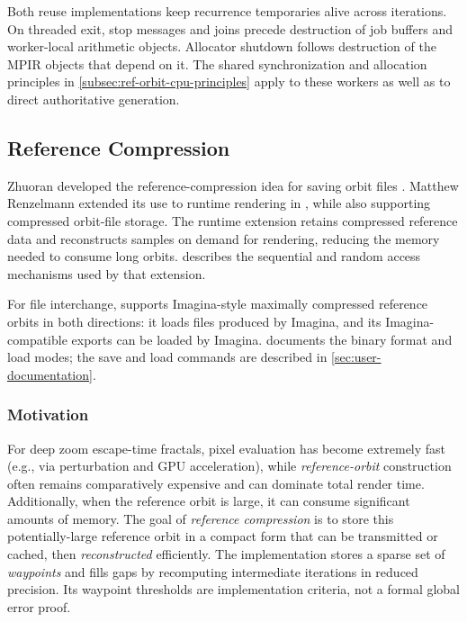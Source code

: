 Both reuse implementations keep recurrence temporaries alive across iterations.
On threaded exit, stop messages and joins precede destruction of job buffers
and worker-local arithmetic objects. Allocator shutdown follows destruction of
the MPIR objects that depend on it. The shared synchronization and allocation
principles in \cref{subsec:ref-orbit-cpu-principles} apply to these workers as
well as to direct authoritative generation.

\subsection{Reference Compression}
\label{sec:ref-compression-zhuoran}

Zhuoran developed the reference-compression idea for saving orbit files
\cite{Zhuoran2023ReferenceCompression}. Matthew Renzelmann extended its use
to runtime rendering in \FractalShark{}, while also supporting compressed
orbit-file storage. The runtime extension retains compressed reference data
and reconstructs samples on demand for rendering, reducing the memory needed
to consume long orbits.  describes the
sequential and random access mechanisms used by that extension.

For file interchange, \FractalShark{} supports Imagina-style maximally
compressed reference orbits in both directions: it loads files produced by
Imagina, and its Imagina-compatible exports can be loaded by Imagina.
 documents the binary format and load modes;
the save and load commands are described in \cref{sec:user-documentation}.

\subsubsection{Motivation}
For deep zoom escape-time fractals, pixel evaluation has become extremely fast
(e.g., via perturbation and GPU acceleration), while \emph{reference-orbit}
construction often remains comparatively expensive and can dominate total render
time.  Additionally, when the reference orbit is large, it can consume
significant amounts of memory.  The goal of \emph{reference compression} is to
store this potentially-large reference orbit in a compact form that can be
transmitted or cached, then \emph{reconstructed} efficiently. The implementation
stores a sparse set of \emph{waypoints} and fills gaps by recomputing
intermediate iterations in reduced precision.  Its waypoint thresholds are
implementation criteria, not a formal global error proof.

